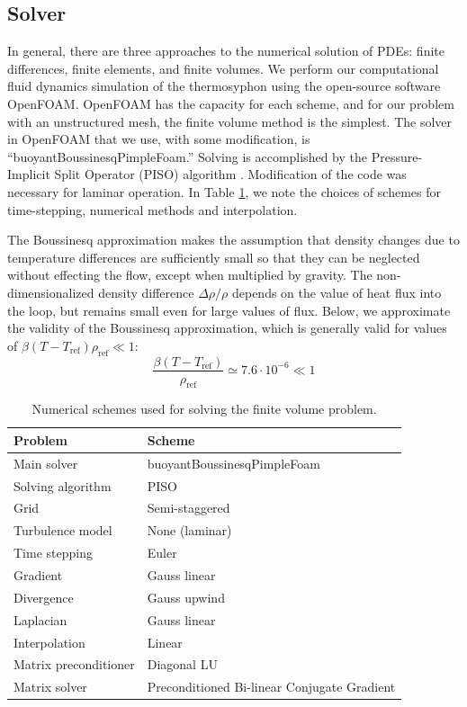 \documentclass[12pt]{report}
\newcommand{\rhoref}{\rho_{\text{ref}}}
\begin{document}
\subsection{Solver}

In general, there are three approaches to the numerical solution of PDEs: finite differences, finite elements, and finite volumes.
We perform our computational fluid dynamics simulation of the thermosyphon using the open-source software OpenFOAM.
OpenFOAM has the capacity for each scheme, and for our problem with an unstructured mesh, the finite volume method is the simplest.
The solver in OpenFOAM that we use, with some modification, is ``buoyantBoussinesqPimpleFoam.''
Solving is accomplished by the Pressure-Implicit Split Operator (PISO) algorithm .
Modification of the code was necessary for laminar operation.
In Table \ref{tb:ofsolution}, we note the choices of schemes for time-stepping, numerical methods and interpolation.


The Boussinesq approximation makes the assumption that density changes due to temperature differences are sufficiently small so that they can be neglected without effecting the flow, except when multiplied by gravity.
The non-dimensionalized density difference $\Delta \rho / \rho$ depends on the value of heat flux into the loop, but remains small even for large values of flux.
Below, we approximate the validity of the Boussinesq approximation, which is generally valid for values of $\beta(T-T_\text{ref})\rhoref \ll 1$:
\begin{equation} \frac{\beta(T - T_\text{ref})}{\rhoref} \simeq 7.6 \cdot 10^{-6} \ll 1 \label{eq:bouss} \end{equation}

\begin{table}
\begin{center}
\begin{tabular}{ll}
\hline
Problem & Scheme\\
\hline
\hline
Main solver & buoyantBoussinesqPimpleFoam\\
\hline
Solving algorithm & PISO\\
\hline
Grid & Semi-staggered\\
\hline
Turbulence model & None (laminar)\\
\hline
Time stepping & Euler\\
\hline
Gradient & Gauss linear\\
\hline
Divergence & Gauss upwind\\
\hline
Laplacian & Gauss linear\\
\hline
Interpolation & Linear\\
\hline
Matrix preconditioner & Diagonal LU\\
\hline
Matrix solver & Preconditioned Bi-linear Conjugate Gradient\\
\hline
\end{tabular}
\caption[Numerical schemes used for solving the finite volume problem]{
  Numerical schemes used for solving the finite volume problem.
  }
\label{tb:ofsolution}
\end{center}
\end{table}
\end{document}
